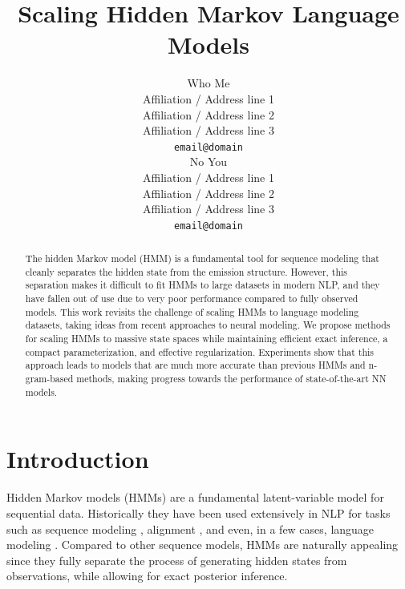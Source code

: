 \documentclass[11pt,a4paper]{article}
\title{Scaling Hidden Markov Language Models}
\author{Who Me \\
  Affiliation / Address line 1 \\
  Affiliation / Address line 2 \\
  Affiliation / Address line 3 \\
  \texttt{email@domain} \\\And
  No You \\
  Affiliation / Address line 1 \\
  Affiliation / Address line 2 \\
  Affiliation / Address line 3 \\
  \texttt{email@domain} \\}
\date{}
\begin{document}
\maketitle
\begin{abstract}
The hidden Markov model (HMM) is a fundamental tool for sequence modeling that 
cleanly separates the hidden state from the emission structure.
However, this separation makes it difficult to fit HMMs to large datasets in modern NLP, 
and they have fallen out of use due to very poor performance 
compared to fully observed models. This work revisits the challenge of 
scaling HMMs to language modeling datasets,
taking ideas from recent approaches to neural modeling.
We propose methods for scaling HMMs to massive state spaces
while maintaining efficient exact inference, a compact parameterization,
and effective regularization.
Experiments show that this approach leads to models that are much more accurate
than previous HMMs and n-gram-based methods,
making progress towards the performance of state-of-the-art NN models. 
\end{abstract}

\section{Introduction}

Hidden Markov models (HMMs) are a fundamental latent-variable model for sequential data.
Historically they have been used extensively in NLP for tasks such as
sequence modeling \citep{rabiner1990tut}, alignment \citep{vogel1996hmm},
and even, in a few cases, language modeling \citep{kuhn1994hmmlm,huang2011thesis}. 
Compared to other sequence models, HMMs are naturally appealing since they 
fully separate the process of generating hidden states from observations,
while allowing for exact posterior inference. 


\end{document}
